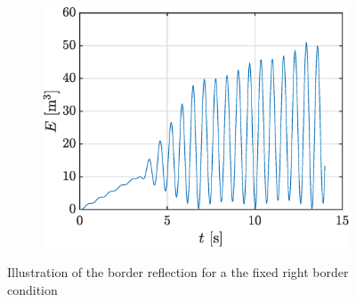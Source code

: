 \documentclass[a4paper,12pt,twoside]{article}
\begin{document}
\begin{figure}[h!]
    \centering
    \begin{subfigure}{0.5\textwidth}
    \includegraphics[width=\textwidth]{graphs/ex1Efixe.eps}
    \end{subfigure}

    \caption{Illustration of the border reflection for a the fixed right border condition}
    \label{fig:ex1fix}
    \end{figure}
\end{document}
